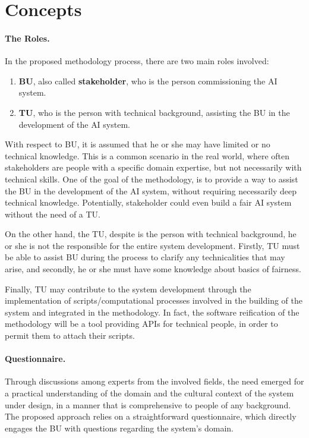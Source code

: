 \documentclass[12pt,a4paper,openright,twoside]{book}
\begin{document}
\section{Concepts}

\paragraph{The Roles.}
In the proposed methodology process, there are two main roles involved:
\begin{enumerate}
    \item \textbf{\ac{BU}}, also called \textbf{stakeholder}, who is the person commissioning the \ac{AI} system.
    \item \textbf{\ac{TU}}, who is the person with technical background, assisting the \ac{BU} in the development of the \ac{AI} system.
\end{enumerate}

With respect to \ac{BU}, it is assumed that he or she may have limited or no technical knowledge.
%
This is a common scenario in the real world, where often stakeholders are people with a specific domain expertise, but not necessarily with technical skills.
%
One of the goal of the methodology, is to provide a way to assist the \ac{BU} in the development of the \ac{AI} system, without requiring necessarily deep technical knowledge.
%
Potentially, stakeholder could even build a fair \ac{AI} system without the need of a \ac{TU}.

On the other hand, the \acl{TU}, despite is the person with technical background, he or she is not the responsible for the entire system development.
%
Firstly, \ac{TU} must be able to assist \ac{BU} during the process to clarify any technicalities that may arise, and secondly, he or she must have some knowledge about basics of fairness.

Finally, \ac{TU} may contribute to the system development through the implementation of scripts/computational processes involved in the building of the system and integrated in the methodology.
%
In fact, the software reification of the methodology will be a tool providing APIs for technical people, in order to permit them to attach their scripts.



\paragraph{Questionnaire.}
Through discussions among experts from the involved fields, the need emerged for a practical understanding of the domain and the cultural context of the system under design, in a manner that is comprehensive to people of any background.
%
The proposed approach relies on a straightforward questionnaire, which directly engages the \acl{BU} with questions regarding the system's domain.
\end{document}

